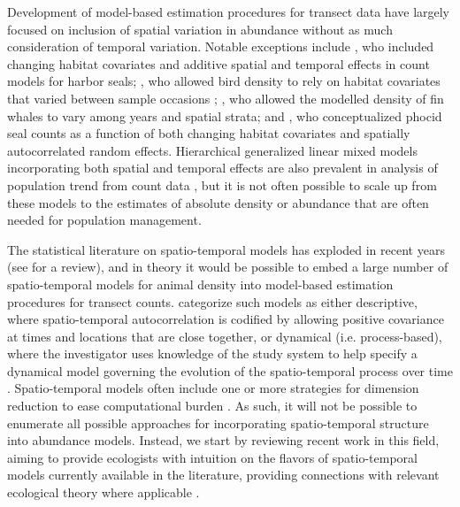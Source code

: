 \documentclass[times,mee,doublespace,]{besauth2}
\begin{document}
Development of model-based estimation procedures for transect data have largely focused on inclusion of spatial variation in abundance without as much consideration of temporal variation.  Notable exceptions include \citet{VerHoefJansen2007}, who included changing habitat covariates and additive spatial and temporal effects in count models for harbor seals; \citet{MillerEtAl11jwm}, who allowed bird density to rely on habitat covariates that varied between sample occasions \citep[using an N-mixture formulation; see][]{Royle2004}; \citet{Moore2011}, who allowed the modelled density of fin whales to vary among years and spatial strata; and \citet{VerHoefEtAl2014}, who conceptualized phocid seal counts as a function of both changing habitat covariates and spatially autocorrelated random effects.  Hierarchical generalized linear mixed models incorporating both spatial and temporal effects are also prevalent in analysis of population trend from count data \citep[e.g.][]{SauerLink2011,RossEtAl2012}, but it is not often possible to scale up from these models to the estimates of absolute density or abundance that are often needed for population management.

The statistical literature on spatio-temporal models has exploded in recent years (see \citeauthor{CressieWikle2011} \citeyear{CressieWikle2011} for a review), and in theory it would be possible to embed a large number of spatio-temporal models for animal density into model-based estimation procedures for transect counts.  \citet{CressieWikle2011} categorize such models as either descriptive, where spatio-temporal autocorrelation is codified by allowing positive covariance at times and locations that are close together, or dynamical (i.e. process-based), where the investigator uses knowledge of the study system to help specify a dynamical model governing the evolution of the spatio-temporal process over time \citep[e.g. via difference equations;][]{WikleHooten2010}.  Spatio-temporal models often include one or more strategies for dimension reduction to ease computational burden \citep[of which there are many; for a review see][]{Wikle2010}.  As such, it will not be possible to enumerate all possible approaches for incorporating spatio-temporal structure into abundance models.
Instead, we start by reviewing recent work in this field, aiming to provide ecologists with intuition on the flavors of spatio-temporal models currently available in the literature, providing connections with relevant ecological theory where applicable \citep[e.g. with ideal free distributions;][]{FretwellLucas1970}.
\end{document}
